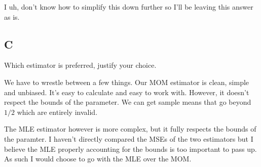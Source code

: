 I uh, don't know how to simplify this down further so I'll be leaving this answer as is. 

\subsection*{C}

Which estimator is preferred, justify your choice.

We have to wrestle between a few things. Our MOM estimator is clean, simple and unbiased. It's easy to calculate and easy to work with. However, it doesn't respect the bounds of the parameter. We can get sample means that go beyond $1/2$ which are entirely invalid. 

The MLE estimator however is more complex, but it fully respects the bounds of the paramter. I haven't directly compared the MSEs of the two estimators but I believe the MLE properly accounting for the bounds is too important to pass up. As such I would choose to go with the MLE over the MOM.

